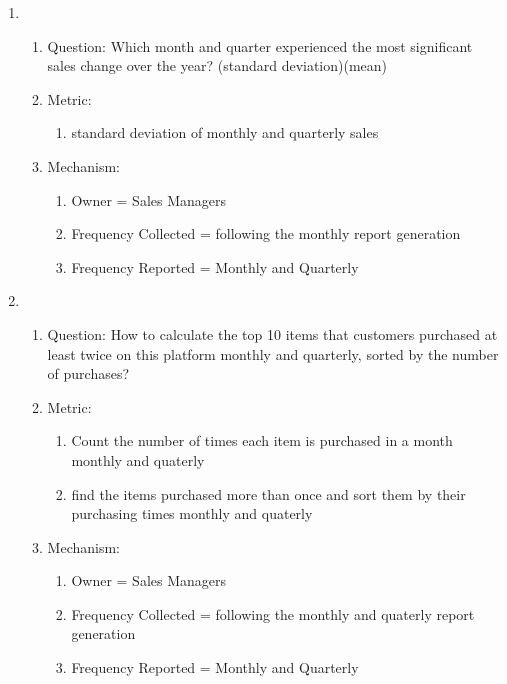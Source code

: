\documentclass[12pt,letterpaper]{report}
\begin{document}
\begin{enumerate}
\item
    \begin{enumerate}
    \item Question: Which month and quarter experienced the most significant sales change over the year? (standard deviation)(mean)
    \item Metric: 
        \begin{enumerate}
            \item  standard deviation of monthly and quarterly sales
        \end{enumerate}
    \item Mechanism:
	\begin{enumerate}
    \item Owner = Sales Managers
    \item Frequency Collected = following the monthly report generation
    \item Frequency Reported = Monthly and Quarterly
    \end{enumerate}
\end{enumerate}

\item
    \begin{enumerate}
    \item Question: How to calculate the top 10 items that customers purchased at least twice on this platform monthly and quarterly, sorted by the number of purchases?
    \item Metric: 
        \begin{enumerate}
            \item  Count the number of times each item is purchased in a month monthly and quaterly
            \item find the items purchased more than once and sort them by their purchasing times monthly and quaterly
        \end{enumerate}
    \item Mechanism:
	\begin{enumerate}
    \item Owner = Sales Managers
    \item Frequency Collected = following the monthly and quaterly report generation
    \item Frequency Reported = Monthly and Quarterly
    \end{enumerate}
\end{enumerate}


\end{enumerate}
\end{document}
